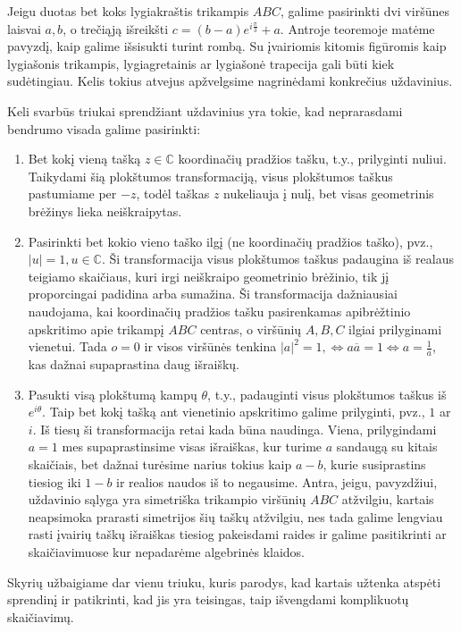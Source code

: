\documentclass[11pt,a4paper,twoside]{book}
\theoremstyle{definition} \newtheorem*{api}{Apibrėžimas}
\theoremstyle{remark} \newtheorem*{pastaba}{Pastaba}
\begin{document}
Jeigu duotas bet koks lygiakraštis trikampis $ABC$, galime pasirinkti dvi viršūnes laisvai $a, b$, o trečiąją išreikšti $c=(b-a)e^{i\frac{\pi}{3}}+a$. Antroje teoremoje matėme pavyzdį, kaip galime išsisukti turint rombą. Su įvairiomis kitomis figūromis kaip lygiašonis trikampis, lygiagretainis ar lygiašonė trapecija gali būti kiek sudėtingiau. Kelis tokius atvejus apžvelgsime nagrinėdami konkrečius uždavinius.

Keli svarbūs triukai sprendžiant uždavinius yra tokie, kad neprarasdami bendrumo visada galime pasirinkti:
\begin{enumerate}
\item Bet kokį vieną tašką $z \in \mathbb{C}$ koordinačių pradžios tašku, t.y., prilyginti nuliui. Taikydami šią plokštumos transformaciją, visus plokštumos taškus pastumiame per $-z$, todėl taškas $z$ nukeliauja į nulį, bet visas geometrinis brėžinys lieka neiškraipytas.
\item Pasirinkti bet kokio vieno taško ilgį (ne koordinačių pradžios taško), pvz., $|u|=1, u \in \mathbb{C}$. Ši transformacija visus plokštumos taškus padaugina iš realaus teigiamo skaičiaus, kuri irgi neiškraipo geometrinio brėžinio, tik jį proporcingai padidina arba sumažina. Ši transformacija dažniausiai naudojama, kai koordinačių pradžios tašku pasirenkamas apibrėžtinio apskritimo apie trikampį $ABC$ centras, o viršūnių $A, B, C$ ilgiai prilyginami vienetui. Tada $o=0$ ir visos viršūnės tenkina $|a|^2=1, \Leftrightarrow a\overline{a}=1 \Leftrightarrow a =\frac{1}{\overline{a}}$, kas dažnai supaprastina daug išraiškų.
\item Pasukti visą plokštumą kampų $\theta$, t.y., padauginti visus plokštumos taškus iš $e^{i\theta}$. Taip bet kokį tašką ant vienetinio apskritimo galime prilyginti, pvz., $1$ ar $i$. Iš tiesų ši transformacija retai kada būna naudinga. Viena, prilygindami $a=1$ mes supaprastinsime visas išraiškas, kur turime $a$ sandaugą su kitais skaičiais, bet dažnai turėsime narius tokius kaip $a-b$, kurie susiprastins tiesiog iki $1-b$ ir realios naudos iš to negausime. Antra, jeigu, pavyzdžiui, uždavinio sąlyga yra simetriška trikampio viršūnių $ABC$ atžvilgiu, kartais neapsimoka prarasti simetrijos šių taškų atžvilgiu, nes tada galime lengviau rasti įvairių taškų išraiškas tiesiog pakeisdami raides ir galime pasitikrinti ar skaičiavimuose kur nepadarėme algebrinės klaidos.
\end{enumerate}


Skyrių užbaigiame dar vienu triuku, kuris parodys, kad kartais užtenka atspėti sprendinį ir patikrinti, kad jis yra teisingas, taip išvengdami komplikuotų skaičiavimų.
\end{document}
